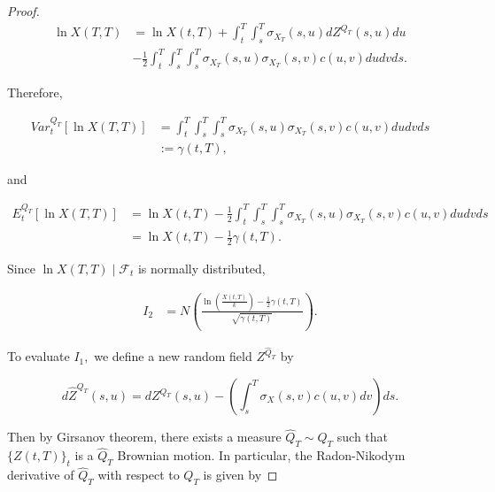 \documentclass[11pt]{article}
\newcommand{\filt}{\ensuremath{\mathcal{F}}}
\begin{document}
\begin{proof}
\begin{equation}
\begin{split}
    \ln X(T,T)&= \ln X(t,T) +\int_t^T\int_s^T \sigma_{X_T}(s,u)dZ^{Q_T}(s,u)du\\
    &-\frac{1}{2}\int_t^T\int_s^T\int_s^T \sigma_{X_T}(s,u)\sigma_{X_T}(s,v)c(u,v)dudvds.
\end{split}
\end{equation}

Therefore,

\begin{equation}\label{lnxvar}
\begin{split}
    Var_t^{Q_T}[\ln X(T,T) ]&=\int_t^T\int_s^T\int_s^T \sigma_{X_T}(s,u)\sigma_{X_T}(s,v)c(u,v)dudvds\\
    &:=\gamma(t,T), 
    \end{split}
\end{equation}

and 

\begin{equation}\label{lnxexp}
    \begin{split}
        E^{Q_T}_t[\ln X(T,T)]&=\ln X(t,T)-\frac{1}{2}\int_t^T\int_s^T\int_s^T \sigma_{X_T}(s,u)\sigma_{X_T}(s,v)c(u,v)dudvds\\
        &=\ln X(t,T)-\frac{1}{2}\gamma(t,T).
    \end{split}
\end{equation}

Since $\ln X(T,T)\mid \filt_t$ is normally distributed,

\begin{equation*}
\begin{split}
    I_2&=N\left(\frac{\ln\left(\frac{X(t,T)}{k}\right)-\frac{1}{2}\gamma(t,T)}{\sqrt{\gamma(t,T)}}\right).
\end{split}
\end{equation*}



To evaluate $I_1,$ we define a new random field ${Z}^{\hat{Q}_T}$ by

\begin{equation}\label{zhat}
    d\hat{Z}^{Q_T}(s,u)=dZ^{Q_T}(s,u)-\left(\int_s^T\sigma_X(s,v)c(u,v)dv\right)ds.
\end{equation}

Then by Girsanov theorem, there exists a measure $\hat{Q}_T\sim Q_T$ such that $\{Z(t,T)\}_t$ is a $\hat{Q}_T$ Brownian motion. In particular, the Radon-Nikodym derivative of $\hat{Q}_T$ with respect to $Q_T$ is given by 


\end{proof}
\end{document}
